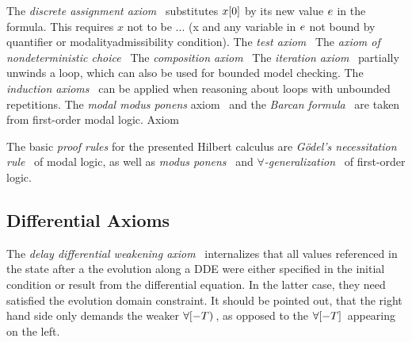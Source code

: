     The \emph{discrete assignment axiom}~ substitutes $x[0]$ by its new value $e$ in the formula.
    This requires $x$ not to be ... (x and any variable in $e$ not bound by quantifier or modalityadmissibility condition).
    The \emph{test axiom}~
    The \emph{axiom of nondeterministic choice}~
    The \emph{composition axiom}~
    The \emph{iteration axiom}~ partially unwinds a loop, which can also be used for bounded model checking.
    The \emph{induction axioms}~
    can be applied when reasoning about loops with unbounded repetitions. 
    The \emph{modal modus ponens} axiom~ and the \emph{Barcan formula}~ are taken from first-order modal logic.
    Axiom~

    The basic \emph{proof rules} for the presented Hilbert calculus are \emph{Gödel's necessitation rule}~ of modal logic, as well as \emph{modus ponens}~ and \emph{$\forall$-generalization}~ of first-order logic.


    \subsection{Differential Axioms}
        \label{sec:differential-axioms}

        The \emph{delay differential weakening axiom}~ internalizes that all values referenced in the state after a the evolution along a DDE were either specified in the initial condition or result from the differential equation. In the latter case, they need satisfied the evolution domain constraint.
        It should be pointed out, that the right hand side only demands the weaker $\forall [-T){\,}$, as opposed to the $\hsc$ appearing on the left.

